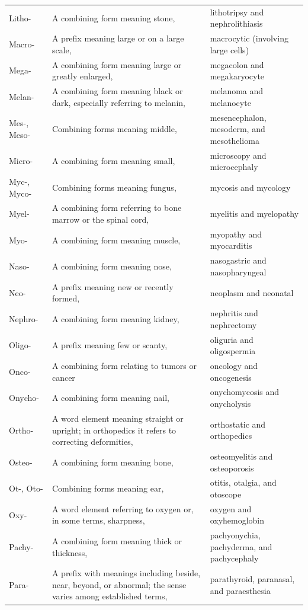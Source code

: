 \begin{longtable}{>{\raggedright\arraybackslash}p{} >{\raggedright\arraybackslash}p{} >{\raggedright\arraybackslash}p{}}
Litho- & A combining form meaning stone, & lithotripsy and nephrolithiasis \\
Macro- & A prefix meaning large or on a large scale, & macrocytic (involving large cells) \\
Mega- & A combining form meaning large or greatly enlarged, & megacolon and megakaryocyte \\
Melan- & A combining form meaning black or dark, especially referring to melanin, & melanoma and melanocyte \\
Mes-, Meso- & Combining forms meaning middle, & mesencephalon, mesoderm, and mesothelioma \\
Micro- & A combining form meaning small, & microscopy and microcephaly \\
Myc-, Myco- & Combining forms meaning fungus, & mycosis and mycology \\
Myel- & A combining form referring to bone marrow or the spinal cord, & myelitis and myelopathy \\
Myo- & A combining form meaning muscle, & myopathy and myocarditis \\
Naso- & A combining form meaning nose, & nasogastric and nasopharyngeal \\
Neo- & A prefix meaning new or recently formed, & neoplasm and neonatal \\
Nephro- & A combining form meaning kidney, & nephritis and nephrectomy \\
Oligo- & A prefix meaning few or scanty, & oliguria and oligospermia \\
Onco- & A combining form relating to tumors or cancer & oncology and oncogenesis \\
Onycho- & A combining form meaning nail, & onychomycosis and onycholysis \\
Ortho- & A word element meaning straight or upright; in orthopedics it refers to correcting deformities, & orthostatic and orthopedics \\
Osteo- & A combining form meaning bone, & osteomyelitis and osteoporosis \\
Ot-, Oto- & Combining forms meaning ear, & otitis, otalgia, and otoscope \\
Oxy- & A word element referring to oxygen or, in some terms, sharpness, & oxygen and oxyhemoglobin \\
Pachy- & A combining form meaning thick or thickness, & pachyonychia, pachyderma, and pachycephaly \\
Para- & A prefix with meanings including beside, near, beyond, or abnormal; the sense varies among established terms, & parathyroid, paranasal, and paraesthesia \\

\end{longtable}
